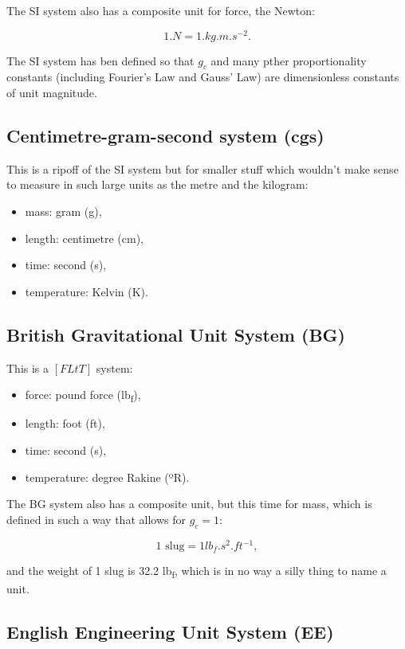 The SI system also has a composite unit for force, the Newton:

\begin{equation*}
  1 \si{.N} = 1 \si{.kg.m.s^{-2}}.
\end{equation*}

The SI system has ben defined so that $g_c$ and many pther proportionality constants (including Fourier's Law and Gauss' Law) are dimensionless constants of unit magnitude.

\subsection*{Centimetre-gram-second system (cgs)}

This is a ripoff of the SI system but for smaller stuff which wouldn't make sense to measure in such large units as the metre and the kilogram:
\begin{itemize}
  \item mass: gram (g),
  \item length: centimetre (cm),
  \item time: second (s),
  \item temperature: Kelvin (K).
\end{itemize}

\subsection*{British Gravitational Unit System (BG)}

This is a $[FLtT]$ system:
\begin{itemize}
  \item force: pound force (\si{lb_f}),
  \item length: foot (ft),
  \item time: second (s),
  \item temperature: degree Rakine (ºR).
\end{itemize}

The BG system also has a composite unit, but this time for mass, which is defined in such a way that allows for $g_c=1$:

\begin{equation*}
  1 \text{ slug} = 1 \si{lb_f.s^2.ft^{-1}},
\end{equation*}

and the weight of 1 slug is 32.2 \si{lb_f}, which is in no way a silly thing to name a unit.

\subsection*{English Engineering Unit System (EE)}

